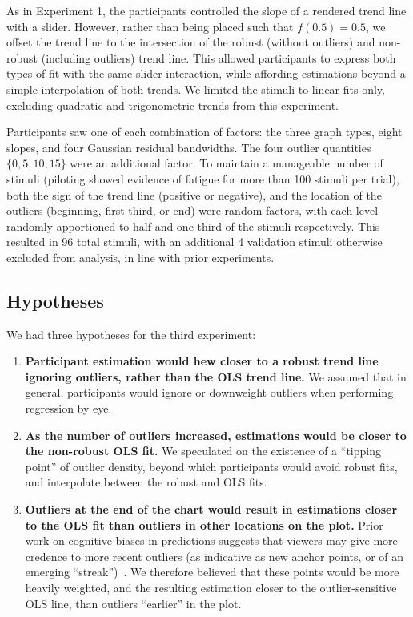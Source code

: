 \documentclass{sigchi}
\begin{document}
As in Experiment 1, the participants controlled the slope of a rendered trend line with a slider. However, rather than being placed such that $f(0.5)=0.5$, we offset the trend line to the intersection of the robust (without outliers) and non-robust (including outliers) trend line. This allowed participants to express both types of fit with the same slider interaction, while affording estimations beyond a simple interpolation of both trends. We limited the stimuli to linear fits only, excluding quadratic and trigonometric trends from this experiment.

Participants saw one of each combination of factors: the three graph types, eight slopes, and four Gaussian residual bandwidths. The four outlier quantities $\{0,5,10,15\}$ were an additional factor. To maintain a manageable number of stimuli (piloting showed evidence of fatigue for more than 100 stimuli per trial), both the sign of the trend line (positive or negative), and the location of the outliers (beginning, first third, or end) were random factors, with each level randomly apportioned to half and one third of the stimuli respectively. This resulted in 96 total stimuli, with an additional 4 validation stimuli otherwise excluded from analysis, in line with prior experiments.

\subsection{Hypotheses}

We had three hypotheses for the third experiment:
\begin{enumerate}
	\item \textbf{Participant estimation would hew closer to a robust trend line ignoring outliers, rather than the OLS trend line.} We assumed that in general, participants would ignore or downweight outliers when performing regression by eye.
	\item \textbf{As the number of outliers increased, estimations would be closer to the non-robust OLS fit.} We speculated on the existence of a ``tipping point'' of outlier density, beyond which participants would avoid robust fits, and interpolate between the robust and OLS fits.
	\item \textbf{Outliers at the end of the chart would result in estimations closer to the OLS fit than outliers in other locations on the plot.} Prior work on cognitive biases in predictions suggests that viewers may give more credence to more recent outliers (as indicative as new anchor points, or of an emerging ``streak'')~\cite{croson2005gambler}. We therefore believed that these points would be more heavily weighted, and the resulting estimation closer to the outlier-sensitive OLS line, than outliers ``earlier'' in the plot.
\end{enumerate}
\end{document}
